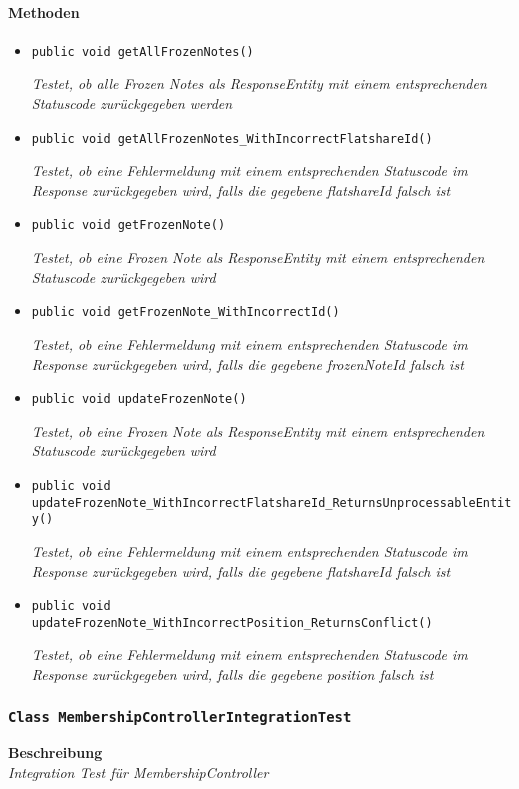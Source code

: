 \paragraph*{Methoden}
 \begin{itemize}
 	\item{\texttt{public void getAllFrozenNotes()}}
 	
 	\textit{Testet, ob alle Frozen Notes als ResponseEntity mit einem entsprechenden Statuscode zurückgegeben werden}
 	
 	\item{\texttt{public void getAllFrozenNotes\_WithIncorrectFlatshareId()}}
 	
 	\textit{Testet, ob eine Fehlermeldung mit einem entsprechenden Statuscode im Response zurückgegeben wird, falls die gegebene flatshareId falsch ist}
 	
 	\item{\texttt{public void getFrozenNote()}}
 	
 	\textit{Testet, ob eine Frozen Note als ResponseEntity mit einem entsprechenden Statuscode zurückgegeben wird}
 	
 	\item{\texttt{public void getFrozenNote\_WithIncorrectId()}}
 	
 	\textit{Testet, ob eine Fehlermeldung mit einem entsprechenden Statuscode im Response zurückgegeben wird, falls die gegebene frozenNoteId falsch ist}
 	
 	\item{\texttt{public void updateFrozenNote()}}
 	
 	\textit{Testet, ob eine Frozen Note als ResponseEntity mit einem entsprechenden Statuscode zurückgegeben wird}
 	
 	\item{\texttt{public void updateFrozenNote\_WithIncorrectFlatshareId\_Returns\-UnprocessableEntity()}}
 	
 	\textit{Testet, ob eine Fehlermeldung mit einem entsprechenden Statuscode im Response zurückgegeben wird, falls die gegebene flatshareId falsch ist}
 	
 	\item{\texttt{public void updateFrozenNote\_WithIncorrectPosition\_ReturnsConflict()}}
 	
 	\textit{Testet, ob eine Fehlermeldung mit einem entsprechenden Statuscode im Response zurückgegeben wird, falls die gegebene position falsch ist}
 \end{itemize}
 
 \subsubsection{\texttt{Class MembershipControllerIntegrationTest}}
 \textbf{Beschreibung} \\
 \textit{Integration Test für MembershipController}
